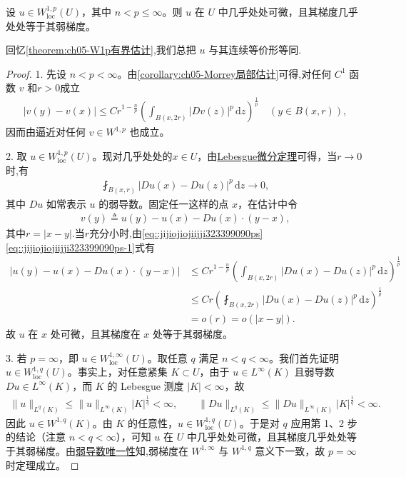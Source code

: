 \documentclass[../../main.tex]{subfiles}
\begin{document}
\begin{theorem}[几乎处处可微]\label{theorem:ch05-a.e.可微}
设 $u\in W^{1,p}_{\mathrm{loc}}(U)$，其中 $n<p\leqslant\infty$。则 $u$ 在 $U$ 中几乎处处可微，且其梯度几乎处处等于其弱梯度。
\end{theorem}
\begin{remark}
回忆\cref{theorem:ch05-W1p有界估计},我们总把 $u$ 与其连续等价形等同.
\end{remark}
\begin{proof}

1. 先设 $n<p<\infty$。由\cref{corollary:ch05-Morrey局部估计}可得,对任何 $C^{1}$ 函数 $v$ 和$r>0$成立
\begin{align}\label{eq::jijiojiojiijji323399090ps}
|v(y)-v(x)|\leqslant Cr^{1-\frac{n}{p}}\left(\int_{B(x,2r)}|Dv(z)|^{p}\,\mathrm{d}z\right)^{\frac{1}{p}}\quad (y\in B(x,r)),
\end{align}
因而由逼近对任何 $v\in W^{1,p}$ 也成立。

2. 取 $u\in W^{1,p}_{\mathrm{loc}}(U)$。现对几乎处处的$x\in U$，由\hyperref[theorem:appE-Lebesgue微分1]{Lebesgue微分定理}可得，当$r\to 0$时,有
\begin{align}\label{eq::jijiojiojiijji323399090ps-1}
\fint_{B(x,r)}|Du(x)-Du(z)|^{p}\,\mathrm{d}z\to 0,
\end{align}
其中 $Du$ 如常表示 $u$ 的弱导数。固定任一这样的点 $x$，在估计中令
\begin{align*}
v(y)\triangleq u(y)-u(x)-Du(x)\cdot(y-x),
\end{align*}
其中$r=|x-y|.$当$r$充分小时,由\eqref{eq::jijiojiojiijji323399090ps}\eqref{eq::jijiojiojiijji323399090ps-1}式有
\begin{align*}
|u(y)-u(x)-Du(x)\cdot(y-x)|
&\leqslant Cr^{1-\frac{n}{p}}\left(\int_{B(x,2r)}|Du(x)-Du(z)|^{p}\,\mathrm{d}z\right)^{\frac{1}{p}}\\
&\leqslant Cr\left(\fint_{B(x,2r)}|Du(x)-Du(z)|^{p}\,\mathrm{d}z\right)^{\frac{1}{p}}\\
&=o(r)=o(|x-y|).
\end{align*}
故 $u$ 在 $x$ 处可微，且其梯度在 $x$ 处等于其弱梯度。

3. 若 $p=\infty$，即 $u\in W^{1,\infty}_{\mathrm{loc}}(U)$。取任意 $q$ 满足 $n<q<\infty$。我们首先证明 $u\in W^{1,q}_{\mathrm{loc}}(U)$。事实上，对任意紧集 $K\subset U$，由于 $u\in L^\infty(K)$ 且弱导数 $Du\in L^\infty(K)$，而 $K$ 的 Lebesgue 测度 $|K|<\infty$，故
\begin{align*}
\|u\|_{L^q(K)} \leqslant \|u\|_{L^\infty(K)} |K|^{\frac{1}{q}} < \infty,\qquad
\|Du\|_{L^q(K)} \leqslant \|Du\|_{L^\infty(K)} |K|^{\frac{1}{q}} < \infty.
\end{align*}
因此 $u\in W^{1,q}(K)$。由 $K$ 的任意性，$u\in W^{1,q}_{\mathrm{loc}}(U)$。于是对 $q$ 应用第 1、2 步的结论（注意 $n<q<\infty$），可知 $u$ 在 $U$ 中几乎处处可微，且其梯度几乎处处等于其弱梯度。由\hyperref[lemma:ch05-弱导数唯一性]{弱导数唯一性}知,弱梯度在 $W^{1,\infty}$ 与 $W^{1,q}$ 意义下一致，故 $p=\infty$ 时定理成立。
\end{proof}
\end{document}
